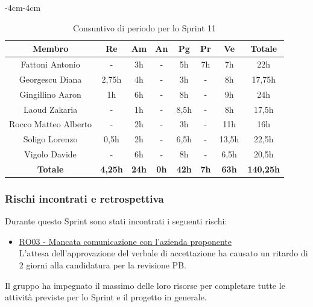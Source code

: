 \documentclass[a4paper,12pt]{article}
\begin{document}
    \begin{table}[H]
    \begin{adjustwidth}{-4cm}{-4cm}
    \centering
    \begin{tabular}{|c|c|c|c|c|c|c|c|}
        \hline
        \textbf{Membro} & \textbf{Re} & \textbf{Am} & \textbf{An} & \textbf{Pg} & \textbf{Pr} & \textbf{Ve} & \textbf{Totale} \\
        \hline
        Fattoni Antonio & - & 3h & - & 5h & 7h & 7h & 22h \\
        \hline
        Georgescu Diana & 2,75h & 4h & - & 3h & - & 8h & 17,75h \\
        \hline
        Gingillino Aaron & 1h & 6h & - & 8h & - & 9h & 24h \\
        \hline
        Laoud Zakaria & - & 1h & - & 8,5h & - & 8h & 17,5h \\
        \hline
        Rocco Matteo Alberto & - & 2h & - & 3h & - & 11h & 16h \\
        \hline
        Soligo Lorenzo & 0,5h & 2h & - & 6,5h & - & 13,5h & 22,5h \\
        \hline
        Vigolo Davide & - & 6h & - & 8h & - & 6,5h & 20,5h \\
        \hline
        \textbf{Totale} & \textbf{4,25h} & \textbf{24h} & \textbf{0h} & \textbf{42h} & \textbf{7h} & \textbf{63h} & \textbf{140,25h} \\
        \hline
    \end{tabular}
    \caption{Consuntivo di periodo per lo Sprint 11}
    \end{adjustwidth}
\end{table}

\subsubsection{Rischi incontrati e retrospettiva}
Durante questo Sprint sono stati incontrati i seguenti rischi:
\begin{itemize}
    \item \hyperref[RO03]{RO03 - Mancata comunicazione con l'azienda proponente} \\L'attesa dell'approvazione del verbale di accettazione ha causato un ritardo di 2 giorni alla candidatura per la revisione PB.
\end{itemize}

Il gruppo ha impegnato il massimo delle loro risorse per completare tutte le attività previste per lo Sprint e il progetto in generale.
\end{document}
